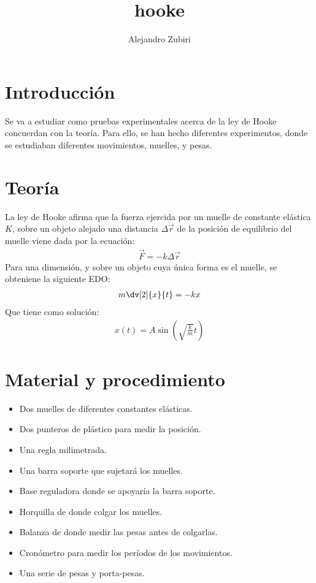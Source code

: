 \documentclass{article}
\author{Alejandro Zubiri}
\title{hooke}
\begin{document}
\maketitle
\tableofcontents
\pagebreak
\section{Introducción}
Se va a estudiar como pruebas experimentales acerca de la ley de Hooke concuerdan con la teoría. Para ello, se han hecho diferentes experimentos, donde se estudiaban diferentes movimientos, muelles, y pesas.
\section{Teoría}
La ley de Hooke afirma que la fuerza ejercida por un muelle de constante elástica $K$, sobre un objeto alejado una distancia $\Delta \vec{r}$ de la posición de equilibrio del muelle viene dada por la ecuación:
\begin{equation}
	\begin{split}
		\boxed{\vec{F} = -k\Delta \vec{r}}
	\end{split}
\end{equation}
Para una dimensión, y sobre un objeto cuya única forma es el muelle, se obteniene la siguiente EDO:
\begin{equation}
	\begin{split}
		m\dv[2]{x}{t}=-kx
	\end{split}
\end{equation}
Que tiene como solución:
\begin{equation}
	\begin{split}
		x(t)=A\sin (\sqrt{\frac{k}{m}}t)
	\end{split}
\end{equation}
\section{Material y procedimiento}
\begin{itemize}
\item Dos muelles de diferentes constantes elásticas.
\item Dos punteros de plástico para medir la posición.
\item Una regla milimetrada.
\item Una barra soporte que sujetará los muelles.
\item Base reguladora donde se apoyaría la barra soporte.
\item Horquilla de donde colgar los muelles.
\item Balanza de donde medir las pesas antes de colgarlas.
\item Cronómetro para medir los períodos de los movimientos.
\item Una serie de pesas y porta-pesas.
\end{itemize}
\end{document}

